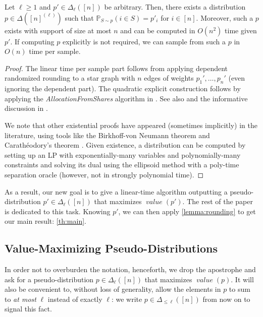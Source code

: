 \documentclass[sigconf,nonacm]{aamas}
\DeclareMathOperator{\valueText}{\textit{value}}
\newcommand{\val}[1]{\valueText({#1})}
\begin{document}
\begin{lemma}\label{lemma:rounding} Let $\ell \geq 1$ and $p' \in \Delta_\ell([n])$ be arbitrary.
Then, there exists a distribution $p \in \Delta\left([n]^{(\ell)}\right)$
such that $\mathbb{P}_{S \sim p}(i \in S) = p'_i$ for $i \in [n]$. Moreover, such a $p$ exists with support of size at most $n$ and can be computed in $O(n^2)$ time given $p'$. If computing $p$ explicitly is not required, we can sample from such a $p$ 
in $O(n)$ time per sample.
\end{lemma}
\begin{proof} The linear time per sample part follows from applying dependent randomized rounding \cite{gandhi_dependent_rounding} to a star graph with $n$ edges of weights $p_1', \dots, p_n'$ (even ignoring the dependent part). The quadratic explicit construction follows by applying the \emph{AllocationFromShares} algorithm in \cite{harris_randomized_rounding}. See also \cite{grimmett_rounding} and the informative discussion in \cite{suzuki_randomized_rounding}.

We note that other existential proofs have appeared (sometimes implicitly) in the literature, using tools like the Birkhoff-von Neumann theorem and Carathéodory's theorem \cite{conitzer_lp_security,selection_minmax_regret_randomized}. Given existence, a distribution can be computed \cite{selection_minmax_regret_randomized} by setting up an LP with exponentially-many variables and polynomially-many constraints and solving its dual using the ellipsoid method with a poly-time separation oracle \cite{grotschel_ellipsoid, schrijver_ellipsoid} (however, not in strongly polynomial time).
\end{proof}

As a result, our new goal is to give a linear-time algorithm outputting a pseudo-distribution $p' \in \Delta_\ell([n])$ that maximizes $\val{p'}$. The rest of the paper is dedicated to this task. Knowing $p'$, we can then apply \cref{lemma:rounding} to get our main result: \cref{th:main}.

\subsection{Value-Maximizing Pseudo-Distributions}

In order not to overburden the notation, henceforth, we drop the apostrophe and ask for a pseudo-distribution $p \in \Delta_\ell([n])$ that maximizes $\val{p}$. It will also be convenient to, without loss of generality, allow the elements in $p$ to sum to \emph{at most} $\ell$ instead of exactly $\ell$: we write $p \in \Delta_{\leq \ell}([n])$ from now on to signal this fact.
\end{document}
